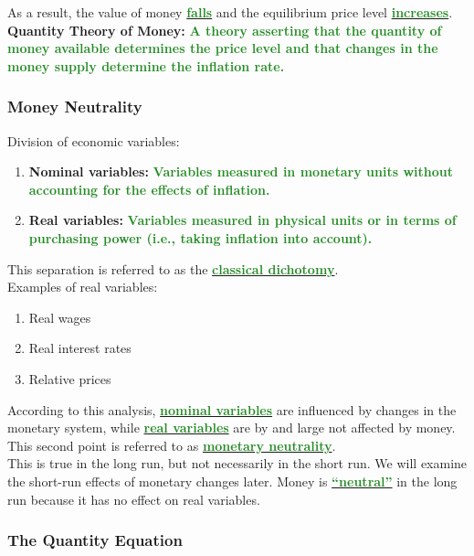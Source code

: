 \documentclass[11pt]{article}\usepackage[]{graphicx}\usepackage[]{color}
\theoremstyle{definition}
\newcommand{\ddp}[1]{{\textbf{\textcolor{ForestGreen}{#1}}}}
\newcommand{\dd}[1]{{\underline{\textbf{\textcolor{ForestGreen}{#1}}}}}
\newcommand{\defn}[1]{\textbf{#1}}
\begin{document}
As a result, the value of money \dd{falls} and the equilibrium price level \dd{increases}. 
\\

\defn{Quantity Theory of Money:} \ddp{A theory asserting that the quantity of money available determines the price level and that changes in the money supply determine the inflation rate.}

\subsubsection*{Money Neutrality}

Division of economic variables:
\begin{enumerate}
	\setlength{\itemsep}{1em}
	\item \textbf{Nominal variables:} \ddp{Variables measured in monetary units without accounting for the effects of inflation.}
	\item \textbf{Real variables:} \ddp{Variables measured in physical units or in terms of purchasing power (i.e., taking inflation into account).}
\end{enumerate}

This separation is referred to as the \dd{classical dichotomy}. 
\\

Examples of real variables:
\begin{enumerate}
	\item Real wages
	\item Real interest rates
	\item Relative prices
\end{enumerate}

According to this analysis, \dd{nominal variables} are influenced by changes in the monetary system, while \dd{real variables} are by and large not affected by money.
\\

This second point is referred to as \dd{monetary neutrality}.
\\

This is true in the long run, but not necessarily in the short run. We will examine the short-run effects of monetary changes later. Money is \dd{``neutral''} in the long run because it has no effect on real variables.

\subsubsection*{The Quantity Equation}
\end{document}
